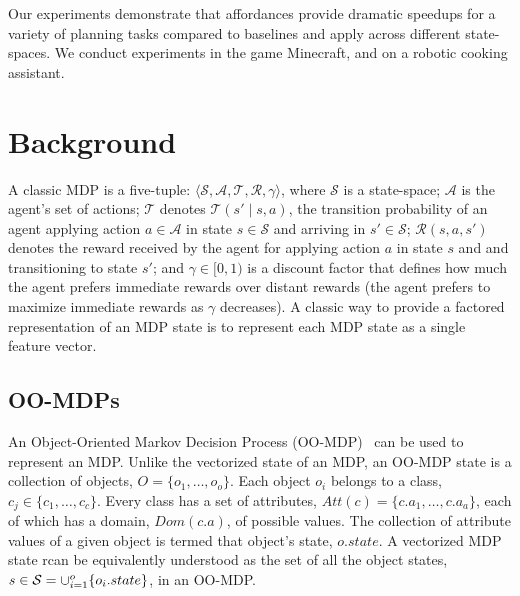 \documentclass[conference]{IEEEtran}
\begin{document}
Our experiments demonstrate that affordances provide dramatic speedups for a variety
of planning tasks compared to baselines and apply across different state-spaces.  We conduct experiments
in the game Minecraft, and on a robotic cooking assistant. 

\section{Background}
\label{sec:background}
A classic MDP is a five-tuple: $\langle \mathcal{S}, \mathcal{A}, \mathcal{T},
\mathcal{R}, \gamma \rangle$, where $\mathcal{S}$ is a state-space;
$\mathcal{A}$ is the agent's set of actions; $\mathcal{T}$ denotes
$\mathcal{T}(s' \mid s,a)$, the transition probability of an agent
applying action $a \in \mathcal{A}$ in state $s \in \mathcal{S}$ and
arriving in $s' \in \mathcal{S}$; $\mathcal{R}(s,a,s')$ denotes the
reward received by the agent for applying action $a$ in state $s$ and
and transitioning to state $s'$; and $\gamma \in [0, 1)$ is a discount
  factor that defines how much the agent prefers immediate rewards
  over distant rewards (the agent prefers to maximize
  immediate rewards as $\gamma$ decreases). A classic way to 
  provide a factored representation of an MDP state is to represent
each MDP state as a single feature vector. 

\subsection{OO-MDPs}
An Object-Oriented Markov
Decision Process (OO-MDP)~\citep{diuk08} can be used to represent an MDP.
Unlike the vectorized state of an MDP, an OO-MDP state is a collection of objects,
$O = \{o_1, \ldots, o_o \}$.  Each object $o_i$ belongs to a
class, $c_j \in  \{c_1, \ldots, c_c\}$. Every class has a set of attributes,
$Att(c) = \{c.a_1, \ldots, c.a_a \}$, each of which has a domain, $Dom(c.a)$, of 
possible values. The collection of attribute values of a given object is termed 
that object's state, $o.state$. A vectorized MDP state rcan be equivalently understood as the set
of all the object states, $s \in {\cal S} = \cup_{i = 1}^o \{o_i.state\}$, in an OO-MDP. 


\end{document}
